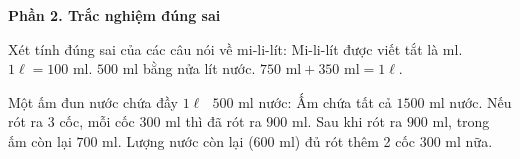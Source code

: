 \textbf{Phần 2. Trắc nghiệm đúng sai}

\begin{ex} %
Xét tính đúng sai của các câu nói về mi-li-lít:
\choiceTF
{\True Mi-li-lít được viết tắt là $\text{ml}$.}
{$1\ell = 100\text{ ml}$.}
{\True $500\text{ ml}$ bằng nửa lít nước.}
{$750\text{ ml} + 350\text{ ml} = 1\ell$.}
\end{ex}

\begin{ex} %
Một ấm đun nước chứa đầy $1\ell\text{ }500\text{ ml}$ nước:
\choiceTF
{\True Ấm chứa tất cả $1500\text{ ml}$ nước.}
{\True Nếu rót ra 3 cốc, mỗi cốc $300\text{ ml}$ thì đã rót ra $900\text{ ml}$.}
{Sau khi rót ra $900\text{ ml}$, trong ấm còn lại $700\text{ ml}$.}
{\True Lượng nước còn lại ($600\text{ ml}$) đủ rót thêm 2 cốc $300\text{ ml}$ nữa.}
\end{ex}

